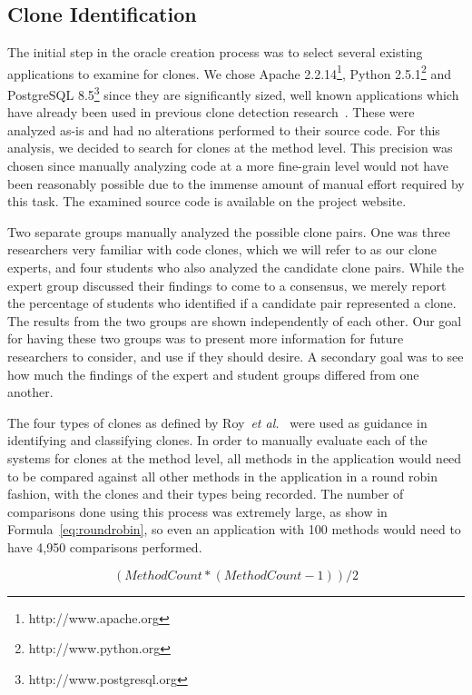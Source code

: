 \documentclass{sig-alternate}
\begin{document}
\subsection{Clone Identification}
The initial step in the oracle creation process was to select several existing applications to examine for clones. We chose Apache 2.2.14\footnote{http://www.apache.org}, Python 2.5.1\footnote{http://www.python.org} and PostgreSQL 8.5\footnote{http://www.postgresql.org} since they are significantly sized, well known applications which have already been used in previous clone detection research~\cite{Kim:2011:MMC:1985793.1985835}. These were analyzed as-is and had no alterations performed to their source code. For this analysis, we decided to search for clones at the method level. This precision was chosen since manually analyzing code at a more fine-grain level would not have been reasonably possible due to the immense amount of manual effort required by this task. The examined source code is available on the project website.

Two separate groups manually analyzed the possible clone pairs. One was three researchers very familiar with code clones, which we will refer to as our clone experts, and four students who also analyzed the candidate clone pairs. While the expert group discussed their findings to come to a consensus, we merely report the percentage of students who identified if a candidate pair represented a clone. The results from the two groups are shown independently of each other. Our goal for having these two groups was to present more information for future researchers to consider, and use if they should desire. A secondary goal was to see how much the findings of the expert and student groups differed from one another.

The four types of clones as defined by Roy~\emph{et al.}~\cite{Roy:2009:CEC:1530898.1531101} were used as guidance in identifying and classifying clones. In order to manually evaluate each of the systems for clones at the method level, all methods in the application would need to be compared against all other methods in the application in a round robin fashion, with the clones and their types being recorded. The number of comparisons done using this process was extremely large, as show in Formula~\ref{eq:roundrobin}, so even an application with 100 methods would need to have 4,950 comparisons performed.

\begin{equation} \label{eq:roundrobin}
(Method Count *(MethodCount-1))/2
\end{equation}
\end{document}

